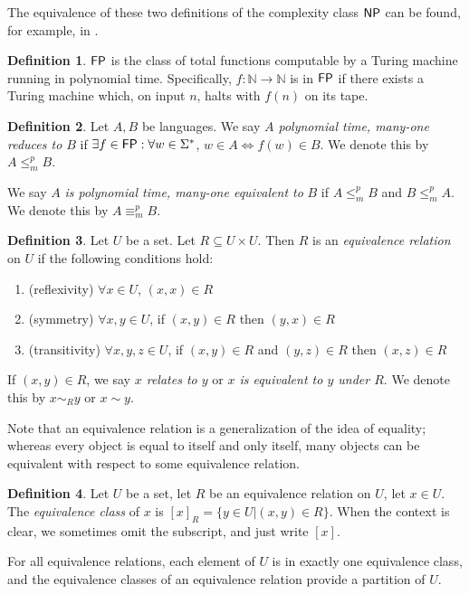 \documentclass{article}
\theoremstyle{definition} \newtheorem{definition}[definition]{Definition}
\newcommand{\sigmastar}{\Sigma^{*}} %
\newcommand{\mor}{\leq^{p}_{m}} %
\newcommand{\moequiv}{\equiv^{p}_m} %
\newcommand{\defn}[1]{\emph{#1}} %
\begin{document}
The equivalence of these two definitions of the complexity class ${\mathsf{NP}}$ can be
found, for example, in \cite{sipser06}.

\begin{definition}
  ${\mathsf{FP}}$ is the class of total functions computable by a Turing machine running
  in polynomial time. Specifically, $f\colon\mathbb{N}\to\mathbb{N}$ is in
  ${\mathsf{FP}}$ if there exists a Turing machine which, on input $n$, halts with $f(n)$
  on its tape.
\end{definition}

\begin{definition}
  Let $A,B$ be languages. We say \defn{$A$ polynomial time, many-one reduces to
    $B$} if $\exists f\in\FP:\forall w\in\sigmastar$, $w\in A\iff f(w)\in
    B$. We denote this by $A\mor B$.
  
  We say $A$ \defn{is polynomial time, many-one equivalent to} $B$ if $A\mor
  B$ and $B\mor A$. We denote this by $A\moequiv B$.
\end{definition}

\begin{definition}
  Let $U$ be a set. Let $R\subseteq U\times U$. Then $R$ is an
    \defn{equivalence relation} on $U$ if the following conditions hold:
    \renewcommand{\labelenumi}{\roman{enumi}.}
  \begin{enumerate}
  \item (reflexivity) $\forall x\in U$, $(x, x)\in R$
  \item (symmetry) $\forall x,y\in U$, if $(x,y)\in R$ then $(y,x)\in
    R$
  \item (transitivity) $\forall x,y,z\in U$, if $(x,y)\in R$ and $(y,z)\in R$
    then $(x,z)\in R$
  \end{enumerate}
  If $(x,y)\in R$, we say \defn{$x$ relates to $y$} or \defn{$x$ is equivalent
    to $y$ under $R$}. We denote this by $x\sim_R y$ or $x\sim y$.
\end{definition}

Note that an equivalence relation is a generalization of the idea of equality;
whereas every object is equal to itself and only itself, many objects can be
equivalent with respect to some equivalence relation.

\begin{definition}
  Let $U$ be a set, let $R$ be an equivalence relation on $U$, let $x\in
  U$. The \defn{equivalence class} of $x$ is $[x]_R=\{y\in U|(x,y)\in
  R\}$. When the context is clear, we sometimes omit the subscript, and just
  write $[x]$.
\end{definition}
For all equivalence relations, each element of $U$ is in exactly one
equivalence class, and the equivalence classes of an equivalence relation
provide a partition of $U$.
\end{document}
